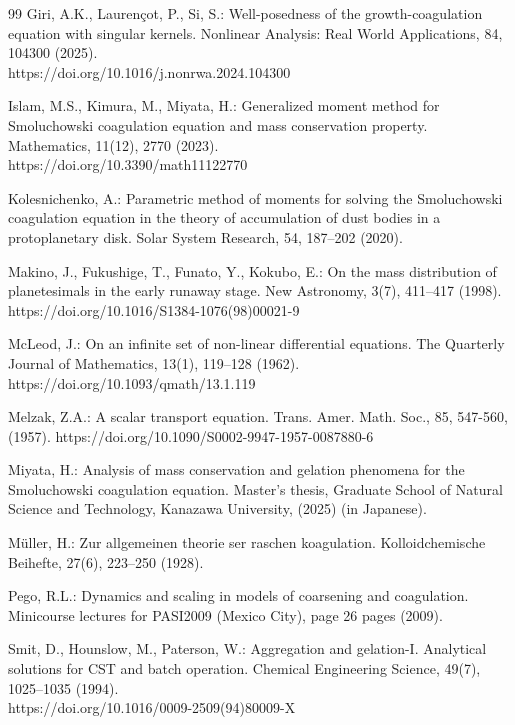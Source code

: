 \documentclass[a4paper,11pt]{article}
\begin{document}
\begin{thebibliography}{99}
Giri, A.K., Lauren\c{c}ot, P., Si, S.:
Well-posedness of the growth-coagulation equation with singular kernels.
Nonlinear Analysis: Real World Applications, 84, 104300 (2025).\\
https://doi.org/10.1016/j.nonrwa.2024.104300

Islam, M.S., Kimura, M., Miyata, H.: Generalized moment method for Smoluchowski
coagulation equation and mass conservation property. Mathematics, 11(12), 2770 (2023).\\ https://doi.org/10.3390/math11122770

Kolesnichenko, A.: Parametric method of moments for solving the Smoluchowski coagulation equation in the theory of accumulation of dust bodies in a protoplanetary disk. Solar System
Research, 54, 187–202 (2020).

Makino, J., Fukushige, T., Funato, Y., Kokubo, E.: On the mass distribution of planetesimals in the early runaway stage. New Astronomy, 3(7), 411–417 (1998).\\
https://doi.org/10.1016/S1384-1076(98)00021-9

McLeod, J.: On an infinite set of non-linear differential equations. The Quarterly Journal
of Mathematics, 13(1), 119–128 (1962).
https://doi.org/10.1093/qmath/13.1.119

Melzak, Z.A.: A scalar transport equation. Trans. Amer. Math. Soc., 85, 547-560, (1957). 
https://doi.org/10.1090/S0002-9947-1957-0087880-6

Miyata, H.: 
Analysis of mass conservation and gelation phenomena for the Smoluchowski coagulation equation.
Master's thesis, Graduate School of Natural Science and Technology, Kanazawa University, (2025) (in Japanese).

M\"{u}ller, H.: Zur allgemeinen theorie ser raschen koagulation. Kolloidchemische Beihefte,
27(6), 223–250 (1928).

Pego, R.L.: Dynamics and scaling in models of coarsening and coagulation. Minicourse
lectures for PASI2009 (Mexico City), page 26 pages (2009).

Smit, D., Hounslow, M., Paterson, W.: Aggregation and gelation-I. Analytical solutions
for CST and batch operation. Chemical Engineering Science, 49(7), 1025–1035 (1994).\\ 
https://doi.org/10.1016/0009-2509(94)80009-X


\end{thebibliography}
\end{document}
